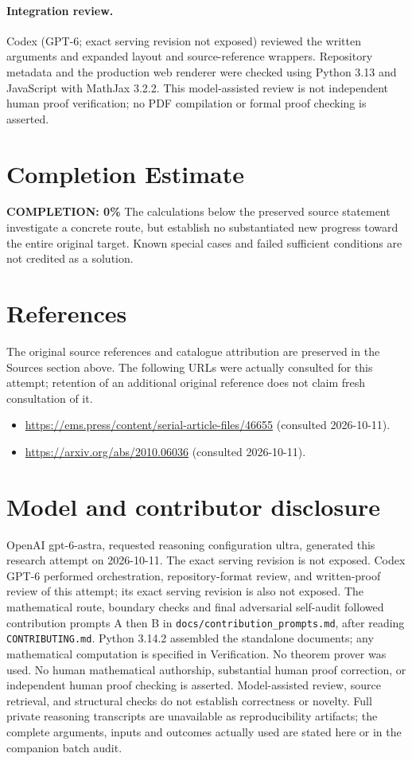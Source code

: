 \documentclass[11pt]{article}
\begin{document}
\paragraph{Integration review.} Codex (GPT-6; exact serving revision not exposed) reviewed the written arguments and expanded layout and source-reference wrappers. Repository metadata and the production web renderer were checked using Python 3.13 and JavaScript with MathJax 3.2.2. This model-assisted review is not independent human proof verification; no PDF compilation or formal proof checking is asserted.

\section{Completion Estimate}
\noindent\textbf{COMPLETION: 0\%}
The calculations below the preserved source statement investigate a concrete route,
but establish no substantiated new progress toward the entire original target.
Known special cases and failed sufficient conditions are not credited as a solution.
\section{References}
The original source references and catalogue attribution are preserved in the
Sources section above. The following URLs were actually consulted for this attempt;
retention of an additional original reference does not claim fresh consultation of it.
\begin{itemize}
\item \url{https://ems.press/content/serial-article-files/46655} (consulted 2026-10-11). 
\item \url{https://arxiv.org/abs/2010.06036} (consulted 2026-10-11). 
\end{itemize}
\section{Model and contributor disclosure}
OpenAI gpt-6-astra, requested reasoning configuration ultra, generated this research
attempt on 2026-10-11. The exact serving revision is not exposed. Codex GPT-6
performed orchestration, repository-format review, and written-proof review of this attempt; its exact serving revision
is also not exposed. The mathematical route, boundary checks and final adversarial
self-audit followed contribution prompts A then B in
\texttt{docs/contribution\_prompts.md}, after reading \texttt{CONTRIBUTING.md}.
Python 3.14.2 assembled the standalone documents; any mathematical computation is
specified in Verification. No theorem prover was used. No human mathematical
authorship, substantial human proof correction, or independent human proof checking
is asserted. Model-assisted review, source retrieval, and structural checks do not
establish correctness or novelty. Full private reasoning transcripts are unavailable
as reproducibility artifacts; the complete arguments, inputs and outcomes actually
used are stated here or in the companion batch audit.
\end{document}
